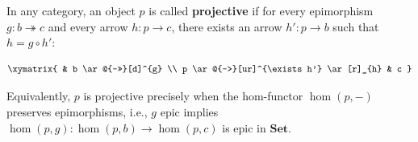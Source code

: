 In any category, an object $p$ is called \textbf{projective} if for every epimorphism $g : b \twoheadrightarrow c$ and every arrow $h : p \rightarrow c$, there exists an arrow $h' : p \rightarrow b$ such that $h = g \circ h'$:

$$\xymatrix{
  & b \ar@{->>}[d]^{g} \\
p \ar@{-->}[ur]^{\exists h'} \ar[r]_{h} & c
}$$

Equivalently, $p$ is projective precisely when the hom-functor $\hom(p, -)$ preserves epimorphisms, i.e., $g$ epic implies $\hom(p, g) : \hom(p, b) \rightarrow \hom(p, c)$ is epic in $\mathbf{Set}$.
